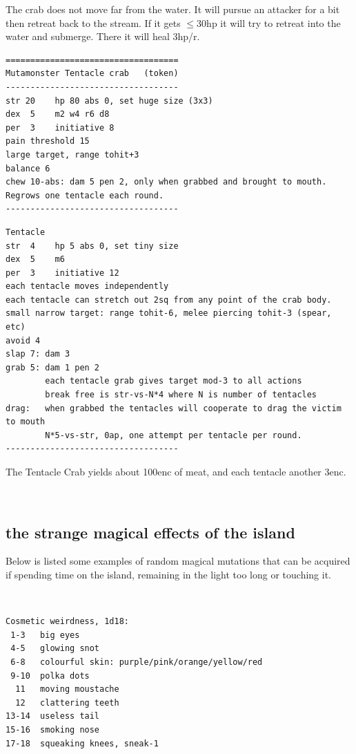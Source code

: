 \begin{description}
The crab does not move far from the water. It will pursue an attacker for a bit then retreat back to the stream. If it gets $\leq$30hp it will try to retreat into the water and submerge. There it will heal 3hp/r.
\goodbreak \small \begin{samepage} \begin{verbatim}
===================================
Mutamonster Tentacle crab   (token)
-----------------------------------
str 20    hp 80 abs 0, set huge size (3x3)
dex  5    m2 w4 r6 d8
per  3    initiative 8
pain threshold 15
large target, range tohit+3
balance 6
chew 10-abs: dam 5 pen 2, only when grabbed and brought to mouth.
Regrows one tentacle each round.
-----------------------------------
\end{verbatim} \goodbreak \begin{verbatim}
Tentacle
str  4    hp 5 abs 0, set tiny size
dex  5    m6
per  3    initiative 12
each tentacle moves independently
each tentacle can stretch out 2sq from any point of the crab body.
small narrow target: range tohit-6, melee piercing tohit-3 (spear, etc)
avoid 4
slap 7: dam 3
grab 5: dam 1 pen 2
        each tentacle grab gives target mod-3 to all actions
        break free is str-vs-N*4 where N is number of tentacles
drag:   when grabbed the tentacles will cooperate to drag the victim to mouth
        N*5-vs-str, 0ap, one attempt per tentacle per round.
-----------------------------------
\end{verbatim} \end{samepage} \normalsize 
The Tentacle Crab yields about 100enc of meat, and each tentacle another 3enc.

\end{description}

\


\subsection*{the strange magical effects of the island}
\label{appendixmagicisland}

Below is listed some examples of random magical mutations that can be acquired if spending time on the island, remaining in the light too long or touching it.

\

\goodbreak \small \begin{samepage} \begin{verbatim}
Cosmetic weirdness, 1d18:
 1-3   big eyes
 4-5   glowing snot
 6-8   colourful skin: purple/pink/orange/yellow/red
 9-10  polka dots
  11   moving moustache
  12   clattering teeth
13-14  useless tail
15-16  smoking nose
17-18  squeaking knees, sneak-1
\end{verbatim} \end{samepage} \normalsize

